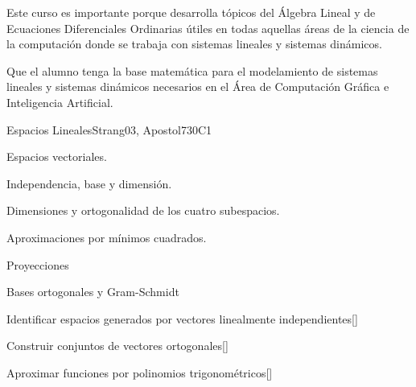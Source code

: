 \begin{syllabus}


\begin{justification}
Este curso es importante porque desarrolla tópicos del Álgebra Lineal y de Ecuaciones Diferenciales Ordinarias útiles en todas aquellas áreas de la ciencia de la computación donde se trabaja con sistemas lineales y sistemas dinámicos.
\end{justification}

\begin{goals}
\item Que el alumno tenga la base matemática para el modelamiento de sistemas lineales y sistemas dinámicos necesarios en el Área de Computación Gráfica e Inteligencia Artificial.
\end{goals}

\begin{outcomes}
  \item {}
  \item {}
  \item {}
\end{outcomes}

\begin{competences}
    \item {} 
    \item {}
    \item {}
\end{competences}

\begin{unit}{Espacios Lineales}{}{Strang03, Apostol73}{0}{C1}
\begin{topics}
      \item Espacios vectoriales.
      \item Independencia, base y dimensión.
      \item Dimensiones y ortogonalidad de los cuatro subespacios.
      \item Aproximaciones por mínimos cuadrados.
      \item Proyecciones
      \item Bases ortogonales y Gram-Schmidt
   \end{topics}
   \begin{learningoutcomes}
      \item Identificar espacios generados por vectores linealmente independientes[\Usage]
      \item Construir conjuntos de vectores ortogonales[\Usage]
      \item Aproximar funciones por polinomios trigonométricos[\Usage]
   \end{learningoutcomes}
\end{unit}


\end{syllabus}
